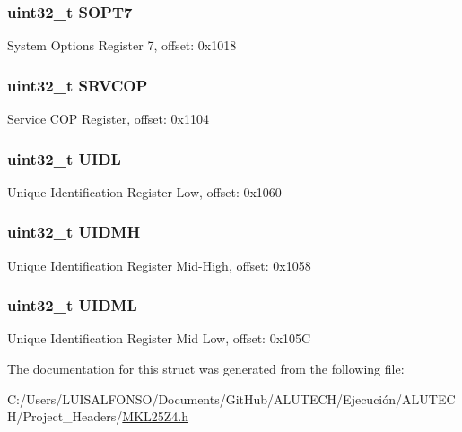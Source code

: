 \subsubsection[{S\+O\+P\+T7}]{\setlength{\rightskip}{0pt plus 5cm}uint32\+\_\+t S\+O\+P\+T7}\label{struct_s_i_m___mem_map_a613f7f9e67cc95762537d6cbf4800ae0}
System Options Register 7, offset\+: 0x1018 \hypertarget{struct_s_i_m___mem_map_a4c7ae6df8582f270aeacca029b051335}{}
\subsubsection[{S\+R\+V\+C\+O\+P}]{\setlength{\rightskip}{0pt plus 5cm}uint32\+\_\+t S\+R\+V\+C\+O\+P}\label{struct_s_i_m___mem_map_a4c7ae6df8582f270aeacca029b051335}
Service C\+O\+P Register, offset\+: 0x1104 \hypertarget{struct_s_i_m___mem_map_a339fceb110e65a719f4566c52270be8e}{}
\subsubsection[{U\+I\+D\+L}]{\setlength{\rightskip}{0pt plus 5cm}uint32\+\_\+t U\+I\+D\+L}\label{struct_s_i_m___mem_map_a339fceb110e65a719f4566c52270be8e}
Unique Identification Register Low, offset\+: 0x1060 \hypertarget{struct_s_i_m___mem_map_a599672d7e15a6f7a2b774a3b06e0e9cc}{}
\subsubsection[{U\+I\+D\+M\+H}]{\setlength{\rightskip}{0pt plus 5cm}uint32\+\_\+t U\+I\+D\+M\+H}\label{struct_s_i_m___mem_map_a599672d7e15a6f7a2b774a3b06e0e9cc}
Unique Identification Register Mid-\/\+High, offset\+: 0x1058 \hypertarget{struct_s_i_m___mem_map_ac0ca2251290fdadcaf84fbe3a7534b6d}{}
\subsubsection[{U\+I\+D\+M\+L}]{\setlength{\rightskip}{0pt plus 5cm}uint32\+\_\+t U\+I\+D\+M\+L}\label{struct_s_i_m___mem_map_ac0ca2251290fdadcaf84fbe3a7534b6d}
Unique Identification Register Mid Low, offset\+: 0x105\+C 

The documentation for this struct was generated from the following file\+:\begin{DoxyCompactItemize}
\item 
C\+:/\+Users/\+L\+U\+I\+S\+A\+L\+F\+O\+N\+S\+O/\+Documents/\+Git\+Hub/\+A\+L\+U\+T\+E\+C\+H/\+Ejecución/\+A\+L\+U\+T\+E\+C\+H/\+Project\+\_\+\+Headers/\hyperlink{_m_k_l25_z4_8h}{M\+K\+L25\+Z4.\+h}\end{DoxyCompactItemize}

